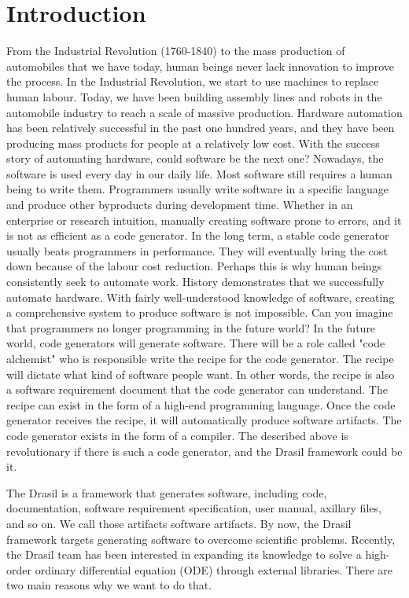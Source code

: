 \chapter{Introduction}
From the Industrial Revolution (1760-1840) to the mass production of automobiles that we have today, human beings never lack innovation to improve the process. In the Industrial Revolution, we start to use machines to replace human labour. Today, we have been building assembly lines and robots in the automobile industry to reach a scale of massive production. Hardware automation has been relatively successful in the past one hundred years, and they have been producing mass products for people at a relatively low cost. With the success story of automating hardware, could software be the next one? Nowadays, the software is used every day in our daily life. Most software still requires a human being to write them. Programmers usually write software in a specific language and produce other byproducts during development time. Whether in an enterprise or research intuition, manually creating software prone to errors, and it is not as efficient as a code generator. In the long term, a stable code generator usually beats programmers in performance. They will eventually bring the cost down because of the labour cost reduction. Perhaps this is why human beings consistently seek to automate work. History demonstrates that we successfully automate hardware. With fairly well-understood knowledge of software, creating a comprehensive system to produce software is not impossible. Can you imagine that programmers no longer programming in the future world? In the future world, code generators will generate software. There will be a role called "code alchemist" who is responsible write the recipe for the code generator. The recipe will dictate what kind of software people want. In other words, the recipe is also a software requirement document that the code generator can understand. The recipe can exist in the form of a high-end programming language. Once the code generator receives the recipe, it will automatically produce software artifacts. The code generator exists in the form of a compiler. The described above is revolutionary if there is such a code generator, and the Drasil framework could be it.

The Drasil is a framework that generates software, including code, documentation, software requirement specification, user manual, axillary files, and so on. We call those artifacts software artifacts. By now, the Drasil framework targets generating software to overcome scientific problems. Recently, the Drasil team has been interested in expanding its knowledge to solve a high-order ordinary differential equation (ODE) through external libraries. There are two main reasons why we want to do that.

